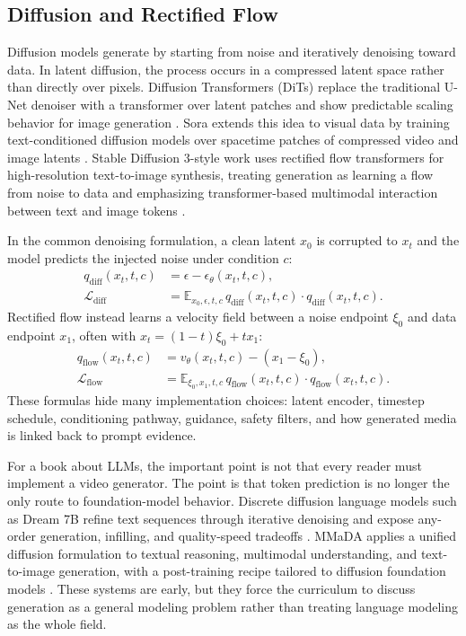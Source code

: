 \subsection{Diffusion and Rectified Flow}
Diffusion models generate by starting from noise and iteratively denoising toward data. In latent diffusion, the process occurs in a compressed latent space rather than directly over pixels. Diffusion Transformers (DiTs) replace the traditional U-Net denoiser with a transformer over latent patches and show predictable scaling behavior for image generation \cite{peebles2023dit}. Sora extends this idea to visual data by training text-conditioned diffusion models over spacetime patches of compressed video and image latents \cite{openai2024sora}. Stable Diffusion 3-style work uses rectified flow transformers for high-resolution text-to-image synthesis, treating generation as learning a flow from noise to data and emphasizing transformer-based multimodal interaction between text and image tokens \cite{esser2024rectifiedflow}.

In the common denoising formulation, a clean latent $x_0$ is corrupted to $x_t$ and the model predicts the injected noise under condition $c$:
\[
  \begin{aligned}
  q_{\mathrm{diff}}(x_t,t,c)
    &= \epsilon-\epsilon_\theta(x_t,t,c),\\
  \mathcal{L}_{\mathrm{diff}}
    &= \mathbb{E}_{x_0,\epsilon,t,c}\,
       q_{\mathrm{diff}}(x_t,t,c)\cdot q_{\mathrm{diff}}(x_t,t,c).
  \end{aligned}
\]
Rectified flow instead learns a velocity field between a noise endpoint $\xi_0$ and data endpoint $x_1$, often with $x_t=(1-t)\xi_0+t x_1$:
\[
  \begin{aligned}
  q_{\mathrm{flow}}(x_t,t,c)
    &= v_\theta(x_t,t,c)-(x_1-\xi_0),\\
  \mathcal{L}_{\mathrm{flow}}
    &= \mathbb{E}_{\xi_0,x_1,t,c}\,
       q_{\mathrm{flow}}(x_t,t,c)\cdot q_{\mathrm{flow}}(x_t,t,c).
  \end{aligned}
\]
These formulas hide many implementation choices: latent encoder, timestep schedule, conditioning pathway, guidance, safety filters, and how generated media is linked back to prompt evidence.

For a book about LLMs, the important point is not that every reader must implement a video generator. The point is that token prediction is no longer the only route to foundation-model behavior. Discrete diffusion language models such as Dream 7B refine text sequences through iterative denoising and expose any-order generation, infilling, and quality-speed tradeoffs \cite{ye2025dream7b}. MMaDA applies a unified diffusion formulation to textual reasoning, multimodal understanding, and text-to-image generation, with a post-training recipe tailored to diffusion foundation models \cite{yang2025mmada}. These systems are early, but they force the curriculum to discuss generation as a general modeling problem rather than treating language modeling as the whole field.

